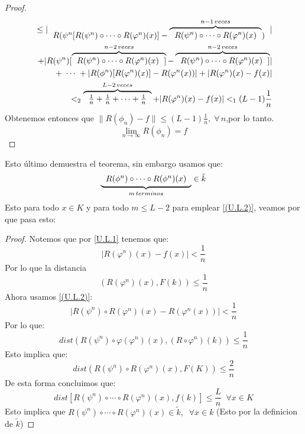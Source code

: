 \documentclass[12pt,a4paper]{book}
\providecommand{\abs}[1]{\lvert#1\rvert}
\providecommand{\norm}[1]{\lVert#1\rVert}
\begin{document}
\begin{proof}
\begin{equation*}
\begin{split}
{\begin{tabular}{c}
\end{tabular}
}
\leq\abs{
\begin{tabular}{c}
$R(\psi^{n}[R(\psi^{n})\circ\cdots\circ R(\varphi^{n})(x)]-
\overbrace{
\begin{tabular}{c}
$R(\psi^{n})\circ\cdots\circ R(\varphi^{n})(x)$
\end{tabular}
}^{n-1\,veces}
)$
\end{tabular}
}\\
+\abs{R(\psi^{n})[\overbrace{
\begin{tabular}{c}
$R(\psi^{n})\circ\cdots\circ R(\varphi^{n})(x)$
\end{tabular}
]}^{n-2\, veces}-
\overbrace{
\begin{tabular}{c}
$R(\psi^{n})\circ\cdots\circ R(\varphi^{n})(x)$
\end{tabular}
]}^{n-2\, veces}
}\\
+\;\cdots\;+\abs{R(\phi^{n})[R(\varphi^{n})(x)]-R(\varphi^{n}(x))}+\abs{R(\varphi^{n})(x)-f(x)}\\
<_{2} 
\overbrace{
\begin{tabular}{c}
$\frac{1}{n}+\frac{1}{n}+\cdots+\frac{1}{n}$
\end{tabular}
}^{L-2\,veces}+\abs{R(\varphi^{n})(x)-f(x)}<_{1} (L-1)\frac{1}{n}
\end{split}
\end{equation*}
Obtenemos entonces que $\norm{R(\phi_{n})-f}\leq(L-1)\frac{1}{n},\;\forall\, n$,por lo tanto.
\begin{equation*}
\lim_{n\rightarrow\infty}R(\phi_{n})=f
\end{equation*}
\end{proof}
Esto último demuestra el teorema, sin embargo usamos que:
$$
\underbrace{
\begin{tabular}{c}
$R(\phi^{n})\circ \cdots \circ R(\phi^{n})(x)$\\
\end{tabular}}_{m\,terminos}
\in \tilde{k}$$
Esto para todo $x\in K$ y para todo $m\leq L-2$ para emplear \ref{(U.L.2)}, veamos por que pasa esto:
\begin{proof}
Notemos que por \ref{U.L.1} tenemos que:
\begin{equation*}
\abs{R(\varphi^{n})(x)-f(x)}<\frac{1}{n}
\end{equation*}
Por lo que la distancia $$(R(\varphi^{n})(x),F(k))\leq \frac{1}{n}$$
Ahora usamos \ref{(U.L.2)}:
$$\abs{R(\psi^{n})\circ R(\varphi^{n})(x)-R(\varphi^{n}(x))}<\frac{1}{n}$$
Por lo que:
$$dist(R(\psi^{n})\circ \varphi(\varphi^{n})(x),(R\circ\varphi^{n})(k))\leq\frac{1}{n}$$
Esto implica que:
$$dist(R(\psi^{n})\circ R(\varphi^{n})(x), F(K))\leq\frac{2}{n}$$
De esta forma concluimos que:
$$dist[R(\psi^{n})\circ\cdots\circ R(\varphi^{n})(x),f(k)]\leq\frac{L}{n}\;\;\forall x\in K$$
Esto implica que $R(\psi^{n})\circ\cdots\circ R(\varphi^{n})(x)\in\tilde{k},\;\;\forall x\in k$ (Esto por la definicion de $\tilde{k}$)
\end{proof}
\end{document}
